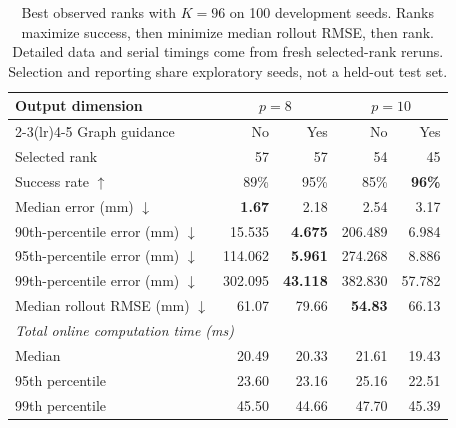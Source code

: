 \begin{table}[htbp]
    \centering
    \small
    \begin{tabular}{lrrrr}
        \toprule
        Output dimension & \multicolumn{2}{c}{$p=8$} & \multicolumn{2}{c}{$p=10$} \\
        \cmidrule(lr){2-3}\cmidrule(lr){4-5}
        Graph guidance & No & Yes & No & Yes \\
        \midrule
        Selected rank & 57 & 57 & 54 & 45 \\
        Success rate $\uparrow$ & 89\% & 95\% & 85\% & \textbf{96\%} \\
        Median error (mm) $\downarrow$ & \textbf{1.67} & 2.18 & 2.54 & 3.17 \\
        90th-percentile error (mm) $\downarrow$ & 15.535 & \textbf{4.675} & 206.489 & 6.984 \\
        95th-percentile error (mm) $\downarrow$ & 114.062 & \textbf{5.961} & 274.268 & 8.886 \\
        99th-percentile error (mm) $\downarrow$ & 302.095 & \textbf{43.118} & 382.830 & 57.782 \\
        Median rollout RMSE (mm) $\downarrow$ & 61.07 & 79.66 & \textbf{54.83} & 66.13 \\
        \midrule
        \multicolumn{5}{l}{\textit{Total online computation time (ms)}} \\
        Median & 20.49 & 20.33 & 21.61 & 19.43 \\
        95th percentile & 23.60 & 23.16 & 25.16 & 22.51 \\
        99th percentile & 45.50 & 44.66 & 47.70 & 45.39 \\
        \bottomrule
    \end{tabular}
    \caption{Best observed ranks with $K=96$ on 100 development seeds. Ranks maximize success, then minimize median rollout RMSE, then rank. Detailed data and serial timings come from fresh selected-rank reruns. Selection and reporting share exploratory seeds, not a held-out test set.}
    \label{tab:best-ranks-k96-compact}
\end{table}
